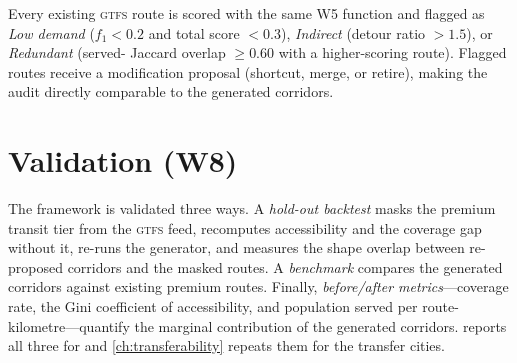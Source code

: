 Every existing \textsc{gtfs} route is scored with the same W5 function and flagged
as \emph{Low demand} ($f_1<\num{0.2}$ and total score $<\num{0.3}$),
\emph{Indirect} (detour ratio $>\num{1.5}$), or \emph{Redundant} (served-\ageb
Jaccard overlap $\ge\num{0.60}$ with a higher-scoring route). Flagged routes receive
a modification proposal (shortcut, merge, or retire), making the audit directly
comparable to the generated corridors.

\section{Validation (W8)}
\label{sec:w8}

The framework is validated three ways. A \emph{hold-out backtest} masks the premium
transit tier from the \textsc{gtfs} feed, recomputes accessibility and the coverage
gap without it, re-runs the generator, and measures the shape overlap between
re-proposed corridors and the masked routes. A \emph{benchmark} compares the
generated corridors against existing premium routes. Finally, \emph{before/after
metrics}---coverage rate, the Gini coefficient of accessibility, and
population served per route-kilometre---quantify the marginal contribution of the
generated corridors.  reports all three for \zmg and
\cref{ch:transferability} repeats them for the transfer cities.
